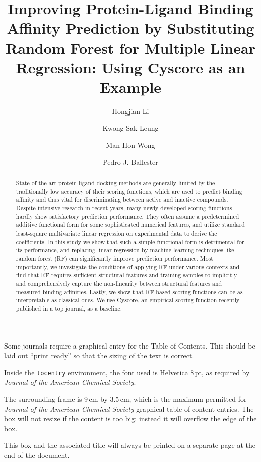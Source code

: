 \documentclass[journal=jacsat,manuscript=article]{achemso}
\author{Hongjian Li}
\author{Kwong-Sak Leung}
\author{Man-Hon Wong}
\affiliation[Chinese University of Hong Kong]
{Department of Computer Science and Engineering, Chinese University of Hong Kong, Shatin, New Territories, Hong Kong}
\author{Pedro J. Ballester}
\affiliation[European Bioinformatics Institute]
{European Bioinformatics Institute, Wellcome Trust Genome Campus, Hinxton, Cambridge - CB10 1SD, UK}
\title[RF::Cyscore]{Improving Protein-Ligand Binding Affinity Prediction by Substituting Random Forest for Multiple Linear Regression: Using Cyscore as an Example}
\begin{document}
\begin{tocentry}

Some journals require a graphical entry for the Table of Contents.
This should be laid out ``print ready'' so that the sizing of the
text is correct.

Inside the \texttt{tocentry} environment, the font used is Helvetica
8\,pt, as required by \emph{Journal of the American Chemical
Society}.

The surrounding frame is 9\,cm by 3.5\,cm, which is the maximum
permitted for  \emph{Journal of the American Chemical Society}
graphical table of content entries. The box will not resize if the
content is too big: instead it will overflow the edge of the box.

This box and the associated title will always be printed on a
separate page at the end of the document.

\end{tocentry}

\begin{abstract}

State-of-the-art protein-ligand docking methods are generally limited by the traditionally low accuracy of their scoring functions, which are used to predict binding affinity and thus vital for discriminating between active and inactive compounds. Despite intensive research in recent years, many newly-developed scoring functions hardly show satisfactory prediction performance. They often assume a predetermined additive functional form for some sophisticated numerical features, and utilize standard least-square multivariate linear regression on experimental data to derive the coefficients. In this study we show that such a simple functional form is detrimental for its performance, and replacing linear regression by machine learning techniques like random forest (RF) can significantly improve prediction performance. Most importantly, we investigate the conditions of applying RF under various contexts and find that RF requires sufficient structural features and training samples to implicitly and comprehensively capture the non-linearity between structural features and measured binding affinities. Lastly, we show that RF-based scoring functions can be as interpretable as classical ones. We use Cyscore, an empirical scoring function recently published in a top journal, as a baseline.

\end{abstract}
\end{document}
